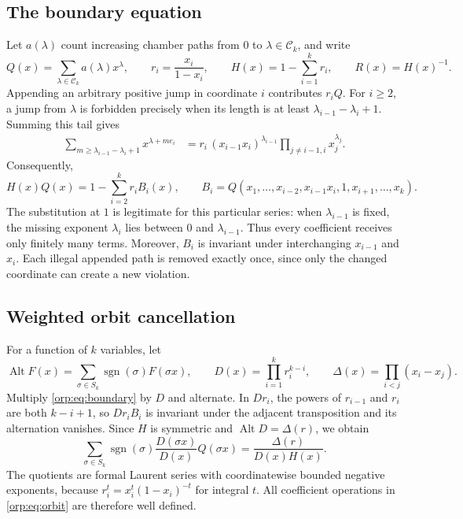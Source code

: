 \documentclass[11pt]{article}
\theoremstyle{remark}\newtheorem{remark}[theorem]{Remark}
\newcommand{\Alt}{\operatorname{Alt}}
\begin{document}
\subsection{The boundary equation}
Let $a(\lambda)$ count increasing chamber paths from $0$ to $\lambda\in\mathcal C_k$, and write
\[
 Q(x)=\sum_{\lambda\in\mathcal C_k}a(\lambda)x^\lambda,
 \qquad r_i=\frac{x_i}{1-x_i},\qquad
 H(x)=1-\sum_{i=1}^k r_i,\qquad R(x)=H(x)^{-1}.
\]
Appending an arbitrary positive jump in coordinate $i$ contributes $r_iQ$. For $i\ge2$, a jump from $\lambda$ is forbidden precisely when its length is at least $\lambda_{i-1}-\lambda_i+1$. Summing this tail gives
\begin{align*}
 \sum_{m\ge\lambda_{i-1}-\lambda_i+1}x^{\lambda+me_i}
 &=r_i\,(x_{i-1}x_i)^{\lambda_{i-1}}
   \prod_{j\ne i-1,i}x_j^{\lambda_j}.
\end{align*}
Consequently,
\begin{equation}\label{orp:eq:boundary}
 H(x)Q(x)=1-\sum_{i=2}^k r_i B_i(x),\qquad
 B_i=Q(x_1,\ldots,x_{i-2},x_{i-1}x_i,1,x_{i+1},\ldots,x_k).
\end{equation}
The substitution at $1$ is legitimate for this particular series: when $\lambda_{i-1}$ is fixed, the missing exponent $\lambda_i$ lies between $0$ and $\lambda_{i-1}$. Thus every coefficient receives only finitely many terms. Moreover, $B_i$ is invariant under interchanging $x_{i-1}$ and $x_i$. Each illegal appended path is removed exactly once, since only the changed coordinate can create a new violation.

\subsection{Weighted orbit cancellation}
For a function of $k$ variables, let
\[
 \Alt F(x)=\sum_{\sigma\in S_k}\operatorname{sgn}(\sigma)F(\sigma x),
 \qquad D(x)=\prod_{i=1}^k r_i^{k-i},
 \qquad \Delta(x)=\prod_{i<j}(x_i-x_j).
\]
Multiply \eqref{orp:eq:boundary} by $D$ and alternate. In $Dr_i$, the powers of $r_{i-1}$ and $r_i$ are both $k-i+1$, so $Dr_iB_i$ is invariant under the adjacent transposition and its alternation vanishes. Since $H$ is symmetric and $\Alt D=\Delta(r)$, we obtain
\begin{equation}\label{orp:eq:orbit}
 \sum_{\sigma\in S_k}\operatorname{sgn}(\sigma)
 \frac{D(\sigma x)}{D(x)}Q(\sigma x)
 =\frac{\Delta(r)}{D(x)H(x)}.
\end{equation}
The quotients are formal Laurent series with coordinatewise bounded negative exponents, because $r_i^t=x_i^t(1-x_i)^{-t}$ for integral $t$. All coefficient operations in \eqref{orp:eq:orbit} are therefore well defined.
\end{document}
